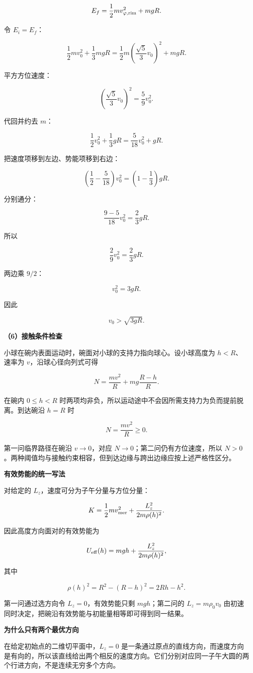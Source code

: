 \documentclass[12pt,a4paper,UTF8]{ctexart}
\begin{document}
\[
E_f=\frac12m v_{\varphi,\rm rim}^2+mgR.
\]

令 \(E_i=E_f\)：

\[
\frac12mv_0^2+\frac13mgR
=\frac12m\left(\frac{\sqrt5}{3}v_0\right)^2+mgR.
\]

平方方位速度：

\[
\left(\frac{\sqrt5}{3}v_0\right)^2
=\frac59v_0^2.
\]

代回并约去 \(m\)：

\[
\frac12v_0^2+\frac13gR
=\frac{5}{18}v_0^2+gR.
\]

把速度项移到左边、势能项移到右边：

\[
\left(\frac12-\frac5{18}\right)v_0^2
=\left(1-\frac13\right)gR.
\]

分别通分：

\[
\frac{9-5}{18}v_0^2=\frac23gR.
\]

所以

\[
\frac29v_0^2=\frac23gR.
\]

两边乘 \(9/2\)：

\[v_0^2=3gR.\]

因此

\[
\boxed{v_0>\sqrt{3gR}}.
\]

\textbf{（6）接触条件检查}

小球在碗内表面运动时，碗面对小球的支持力指向球心。设小球高度为
\(h<R\)、速率为 \(v\)，沿球心径向列式可得

\[
N=\frac{mv^2}{R}+mg\frac{R-h}{R}.
\]

在碗内 \(0\le h<R\)
时两项均非负，所以运动途中不会因所需支持力为负而提前脱离。到达碗沿
\(h=R\) 时

\[N=\frac{mv^2}{R}\ge0.\]

第一问临界路径在碗沿 \(v\to0\)，对应 \(N\to0\)；第二问仍有方位速度，所以
\(N>0\)。两种阈值均与接触约束相容，但到达边缘与跨出边缘应按上述严格性区分。

\textbf{有效势能的统一写法}

对给定的 \(L_z\)，速度可分为子午分量与方位分量：

\[
K=\frac12mv_{\rm mer}^2
+\frac{L_z^2}{2m\rho(h)^2}.
\]

因此高度方向面对的有效势能为

\[
U_{\rm eff}(h)=mgh+
\frac{L_z^2}{2m\rho(h)^2},
\]

其中

\[
\rho(h)^2=R^2-(R-h)^2=2Rh-h^2.
\]

第一问通过选方向令 \(L_z=0\)，有效势能只剩 \(mgh\)；第二问的
\(L_z=m\rho_0v_0\)
由初速同时决定，把碗沿有效势能与初能量相等即可得到同一结果。

\textbf{为什么只有两个最优方向}

在给定初始点的二维切平面中，\(L_z=0\)
是一条通过原点的直线方向，而速度方向是有向的，所以该直线给出两个相反的速度方向。它们分别对应同一子午大圆的两个行进方向，不是连续无穷多个方向。
\end{document}
